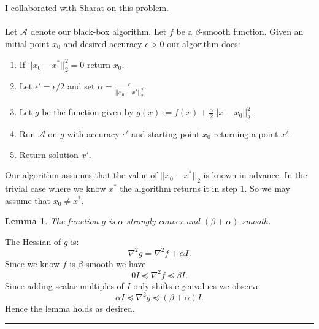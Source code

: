 \documentclass[letterpaper,12pt,oneside,onecolumn]{article}
\newcommand{\cA}{\mathcal{A}} \newcommand{\cB}{\mathcal{B}}
\newenvironment{proof}{{\bf Proof:  }}{\hfill\rule{2mm}{2mm}}
\newtheorem{lemma}[fact]{Lemma}
\begin{document}
\section{}
\paragraph{}
I collaborated with Sharat on this problem.
\paragraph{}
Let $\cA$ denote our black-box algorithm. Let $f$ be a $\beta$-smooth function. Given an initial point $x_0$ and desired accuracy $\epsilon > 0$ our algorithm does:
\begin{enumerate}
\item If $||x_0 - x^*||_2^2 = 0$ return $x_0$.
\item Let $\epsilon' = \epsilon/2$ and set $\alpha = \frac{\epsilon}{||x_0 - x^*||_2^2}$.
\item Let $g$ be the function given by $g(x) := f(x) + \frac{\alpha}{2}||x - x_0||_2^2$.
\item Run $\cA$ on $g$ with accuracy $\epsilon'$ and starting point $x_0$ returning a point $x'$.
\item Return solution $x'$.
\end{enumerate} 
Our algorithm assumes that the value of $||x_0 - x^*||_2$ is known in advance. In the trivial case where we know $x^*$ the algorithm returns it in step $1$. So we may assume that $x_0 \neq x^*$.
\begin{lemma}\label{lemma:convex-smooth}
The function $g$ is $\alpha$-strongly convex and $(\beta + \alpha)$-smooth.
\end{lemma}
\begin{proof}
The Hessian of $g$ is:
$$\nabla^2 g = \nabla^2 f + \alpha I.$$
Since we know $f$ is $\beta$-smooth we have
$$0I \preccurlyeq \nabla^2 f \preccurlyeq \beta I.$$
Since adding scalar multiples of $I$ only shifts eigenvalues we observe
$$\alpha I \preccurlyeq \nabla^2 g \preccurlyeq (\beta + \alpha) I.$$
Hence the lemma holds as desired. 
\end{proof}
\end{document}
